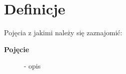\section*{Definicje}
	Pojęcia z jakimi należy się zaznajomić:
	\begin{description}
	
		\item[\textbf{Pojęcie}] - opis

	\end{description}
